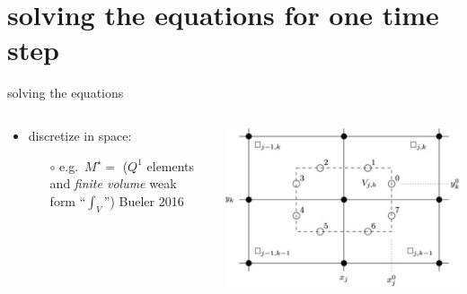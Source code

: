 \documentclass[hide notes,intlimits,usenames,dvipsnames]{beamer}
\begin{document}
\section{solving the equations for one time step}

\begin{frame}{solving the equations}
\begin{columns}
\begin{column}{0.55\textwidth}
\begin{itemize}
\item discretize in space:
    \begin{itemize}
    \item[$\circ$] e.g.~$M^\star=$ ($Q^1$ elements and \emph{finite volume} weak form ``$\int_V$'') Bueler 2016
    \end{itemize}
\end{itemize}
\end{column}
\begin{column}{0.45\textwidth}
\bigskip

\includegraphics[width=\textwidth]{mstarstencil.png} 
\end{column}
\end{columns}


\end{frame}
\end{document}
